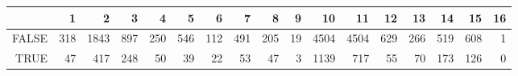 \begin{table}[ht]
\centering
\begin{tabular}{rrrrrrrrrrrrrrrrr}
  \hline
 & 1 & 2 & 3 & 4 & 5 & 6 & 7 & 8 & 9 & 10 & 11 & 12 & 13 & 14 & 15 & 16 \\ 
  \hline
FALSE & 318 & 1843 & 897 & 250 & 546 & 112 & 491 & 205 &  19 & 4504 & 4504 & 629 & 266 & 519 & 608 &   1 \\ 
  TRUE &  47 & 417 & 248 &  50 &  39 &  22 &  53 &  47 &   3 & 1139 & 717 &  55 &  70 & 173 & 126 &   0 \\ 
   \hline
\end{tabular}
\end{table}
